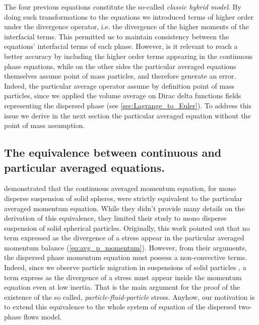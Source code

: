 The four previous equations constitute the so-called \textit{classic hybrid model}. 
By doing such transformations to the equations we introduced terms of higher order under the divergence operator, i.e. the divergence of the higher moments of the interfacial terms. 
This permitted us to maintain consistency between the equations' interfacial terms of each phase. 
However, is it relevant to reach a better accuracy by including the higher order terms appearing in the continuous phase equations, 
while on the other sides the particular averaged equations themselves assume point of mass particles, and therefore generate an error. 
Indeed, the particular average operator assume by definition point of mass particles, since we applied the volume average on Dirac delta functions fields representing the dispersed phase  (see \ref{sec:Lagrange_to_Euler}).  
To address this issue we derive in the next section the particular averaged equation without the point of mass assumption. 

\subsection{The equivalence between continuous and particular averaged equations.}


\citet{nott2011suspension} demonstrated that the continuous averaged momentum equation, for mono disperse suspension of solid spheres, were strictly equivalent to the particular averaged momentum equation.
While they didn't provide many details on the derivation of this equivalence, they limited their study to mono disperse suspension of solid spherical particles. 
Originally, this work pointed out that no term expressed as the divergence of a stress appear in the particular averaged momentum balance (\ref{eq:avg_p_momentum}).
However, from their arguments, the dispersed phase momentum equation must possess a non-convective terms.
Indeed, since we observe particle migration in suspensions of solid particles \citep{guazzelli2011}, a term express as the divergence of a stress must appear inside the momentum equation even at low inertia. 
That is the main argument for the proof of the existence of the so called, \textit{particle-fluid-particle} stress.
Anyhow, our motivation is to extend this equivalence to the whole system of equation of the dispersed two-phase flows model.  


